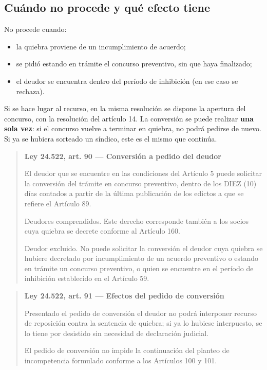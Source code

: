 \documentclass[12pt,oneside]{book}
\newenvironment{articulo}[1]
  {\begin{quote}\small\textbf{#1}\par\smallskip}
  {\end{quote}}
\begin{document}

\subsection{Cuándo no procede y qué efecto tiene}

No procede cuando:
\begin{itemize}
    \item la quiebra proviene de un incumplimiento de acuerdo;
    \item se pidió estando en trámite el concurso preventivo, sin que haya finalizado;
    \item el deudor se encuentra dentro del período de inhibición (en ese caso se rechaza).
\end{itemize}

Si se hace lugar al recurso, en la misma resolución se dispone la apertura del concurso, con la resolución del artículo 14. La conversión se puede realizar \textbf{una sola vez}: si el concurso vuelve a terminar en quiebra, no podrá pedirse de nuevo. Si ya se hubiera sorteado un síndico, este es el mismo que continúa.

\begin{articulo}{Ley 24.522, art. 90 --- Conversión a pedido del deudor}
El deudor que se encuentre en las condiciones del Artículo 5 puede solicitar la conversión del trámite en concurso preventivo, dentro de los DIEZ (10) días contados a partir de la última publicación de los edictos a que se refiere el Artículo 89.

Deudores comprendidos. Este derecho corresponde también a los socios cuya quiebra se decrete conforme al Artículo 160.

Deudor excluido. No puede solicitar la conversión el deudor cuya quiebra se hubiere decretado por incumplimiento de un acuerdo preventivo o estando en trámite un concurso preventivo, o quien se encuentre en el período de inhibición establecido en el Artículo 59.
\end{articulo}

\begin{articulo}{Ley 24.522, art. 91 --- Efectos del pedido de conversión}
Presentado el pedido de conversión el deudor no podrá interponer recurso de reposición contra la sentencia de quiebra; si ya lo hubiese interpuesto, se lo tiene por desistido sin necesidad de declaración judicial.

El pedido de conversión no impide la continuación del planteo de incompetencia formulado conforme a los Artículos 100 y 101.
\end{articulo}
\end{document}
